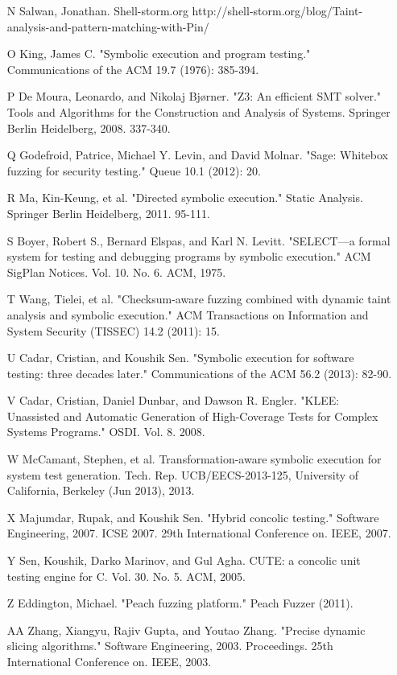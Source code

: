 \documentclass[11pt,expanded,copyright]{fsuthesis}
\begin{document}
\begin{itemize}
	\item [N] Salwan, Jonathan. Shell-storm.org http://shell-storm.org/blog/Taint-analysis-and-pattern-matching-with-Pin/
	\item [O] King, James C. "Symbolic execution and program testing." Communications of the ACM 19.7 (1976): 385-394.
	\item [P] De Moura, Leonardo, and Nikolaj Bjørner. "Z3: An efficient SMT solver." Tools and Algorithms for the Construction and Analysis of Systems. Springer Berlin Heidelberg, 2008. 337-340.
	\item [Q] Godefroid, Patrice, Michael Y. Levin, and David Molnar. "Sage: Whitebox fuzzing for security testing." Queue 10.1 (2012): 20.
	\item [R] Ma, Kin-Keung, et al. "Directed symbolic execution." Static Analysis. Springer Berlin Heidelberg, 2011. 95-111.
	\item [S] Boyer, Robert S., Bernard Elspas, and Karl N. Levitt. "SELECT—a formal system for testing and debugging programs by symbolic execution." ACM SigPlan Notices. Vol. 10. No. 6. ACM, 1975.
	\item [T] Wang, Tielei, et al. "Checksum-aware fuzzing combined with dynamic taint analysis and symbolic execution." ACM Transactions on Information and System Security (TISSEC) 14.2 (2011): 15.
	\item [U] Cadar, Cristian, and Koushik Sen. "Symbolic execution for software testing: three decades later." Communications of the ACM 56.2 (2013): 82-90.
	\item [V] Cadar, Cristian, Daniel Dunbar, and Dawson R. Engler. "KLEE: Unassisted and Automatic Generation of High-Coverage Tests for Complex Systems Programs." OSDI. Vol. 8. 2008.
	\item [W] McCamant, Stephen, et al. Transformation-aware symbolic execution for system test generation. Tech. Rep. UCB/EECS-2013-125, University of California, Berkeley (Jun 2013), 2013.
	\item [X] Majumdar, Rupak, and Koushik Sen. "Hybrid concolic testing." Software Engineering, 2007. ICSE 2007. 29th International Conference on. IEEE, 2007.
	\item [Y] Sen, Koushik, Darko Marinov, and Gul Agha. CUTE: a concolic unit testing engine for C. Vol. 30. No. 5. ACM, 2005.
	\item [Z] Eddington, Michael. "Peach fuzzing platform." Peach Fuzzer (2011).
	\item [AA] Zhang, Xiangyu, Rajiv Gupta, and Youtao Zhang. "Precise dynamic slicing algorithms." Software Engineering, 2003. Proceedings. 25th International Conference on. IEEE, 2003.

\end{itemize}
\end{document}
